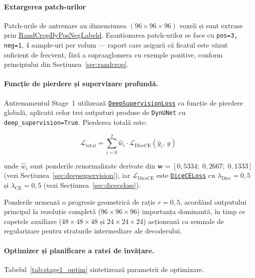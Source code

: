 \documentclass[12pt, a4paper]{report}
\begin{document}
\paragraph{Extargerea patch-urilor}
Patch-urile de antrenare au dimensiunea $(96 \times 96 \times 96)$ voxeli
și sunt extrase prin \hyperref[sec:randcrop]{RandCropByPosNegLabeld}.
Eșantionarea patch-urilor se face cu \texttt{pos=3, neg=1},
4 sample-uri per volum — raport care asigură că ficatul este văzut
suficient de frecvent, fără a supraaglomera cu exemple pozitive,
conform principiului din Secțiunea~\ref{sec:randcrop}.







\paragraph{Funcție de pierdere și supervizare profundă.}
Antrenamentul Stage~1 utilizează
\hyperref[sec:deepsupervision]{\texttt{DeepSupervisionLoss}}
ca funcție de pierdere globală, aplicată celor trei outputuri
produse de \texttt{DynUNet} cu \texttt{deep\_supervision=True}.
Pierderea totală este:

\begin{equation}
    \mathcal{L}_{\text{total}}
    = \sum_{i=0}^{2}
      \hat{w}_i \cdot \mathcal{L}_{\text{DiceCE}}(\hat{y}_i,\, y)
\end{equation}

unde $\hat{w}_i$ sunt ponderile renormalizate derivate din
$\mathbf{w} = [0{,}5334;\; 0{,}2667;\; 0{,}1333]$
(vezi Secțiunea~\ref{sec:deepsupervision}), iar
$\mathcal{L}_{\text{DiceCE}}$ este
\hyperref[sec:diceceloss]{\texttt{DiceCELoss}} cu
$\lambda_{\text{Dice}} = 0{,}5$ și $\lambda_{\text{CE}} = 0{,}5$
(vezi Secțiunea~\ref{sec:diceceloss}).

Ponderile urmează o progresie geometrică de rație $r = 0{,}5$,
acordând outputului principal la rezoluție completă
($96 \times 96 \times 96$) importanța dominantă, în timp ce
capetele auxiliare ($48 \times 48 \times 48$ și
$24 \times 24 \times 24$) acționează ca semnale de regularizare
pentru straturile intermediare ale decoderului.

\paragraph{Optimizer și planificare a ratei de învățare.}
Tabelul~\ref{tab:stage1_optim} sintetizează parametrii de optimizare.
\end{document}
